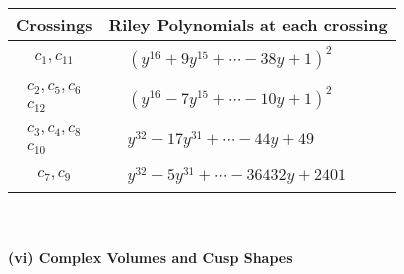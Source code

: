\documentclass[1p]{elsarticle_modified}
\theoremstyle{definition}
\begin{document}
\begin{tabular}{m{50pt}|m{274pt}}
Crossings & \hspace{64pt}Riley Polynomials at each crossing \\
\hline $$\begin{aligned}c_{1},c_{11}\end{aligned}$$&$\begin{aligned}
&(y^{16}+9 y^{15}+\cdots-38 y+1)^{2}
\end{aligned}$\\
\hline $$\begin{aligned}c_{2},c_{5},c_{6}\\c_{12}\end{aligned}$$&$\begin{aligned}
&(y^{16}-7 y^{15}+\cdots-10 y+1)^{2}
\end{aligned}$\\
\hline $$\begin{aligned}c_{3},c_{4},c_{8}\\c_{10}\end{aligned}$$&$\begin{aligned}
&y^{32}-17 y^{31}+\cdots-44 y+49
\end{aligned}$\\
\hline $$\begin{aligned}c_{7},c_{9}\end{aligned}$$&$\begin{aligned}
&y^{32}-5 y^{31}+\cdots-36432 y+2401
\end{aligned}$\\
\hline
\end{tabular}\\~\\
\newpage\flushleft \textbf{(vi) Complex Volumes and Cusp Shapes}
\end{document}

